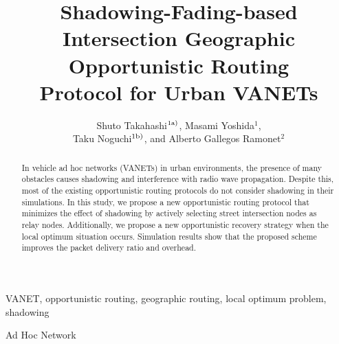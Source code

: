 \documentclass{comex}
\title{Shadowing-Fading-based \\Intersection  Geographic \\Opportunistic Routing \\ Protocol for Urban VANETs}
\author{Shuto Takahashi$^{\rm 1a)}$, Masami Yoshida$^{1}$,\\ Taku Noguchi$^{\rm 1b)}$, and Alberto Gallegos Ramonet$^{2}$}
\begin{document}
\maketitle

\begin{abstract}   

In vehicle ad hoc networks (VANETs) in urban environments, the presence of many obstacles causes shadowing and interference with radio wave propagation. Despite this, most of the existing opportunistic routing protocols do not consider shadowing in their simulations. In this study, we propose a new opportunistic routing protocol that minimizes the effect of shadowing by actively selecting street intersection nodes as relay nodes.
Additionally, we propose a new opportunistic recovery strategy when the local optimum situation occurs. Simulation results show that the proposed scheme improves the packet delivery ratio and overhead.

\end{abstract}

\begin{keywords}
VANET, opportunistic routing, geographic routing, local optimum problem, shadowing
\end{keywords}

\begin{classification}
Ad Hoc Network
\end{classification}







\end{document}
